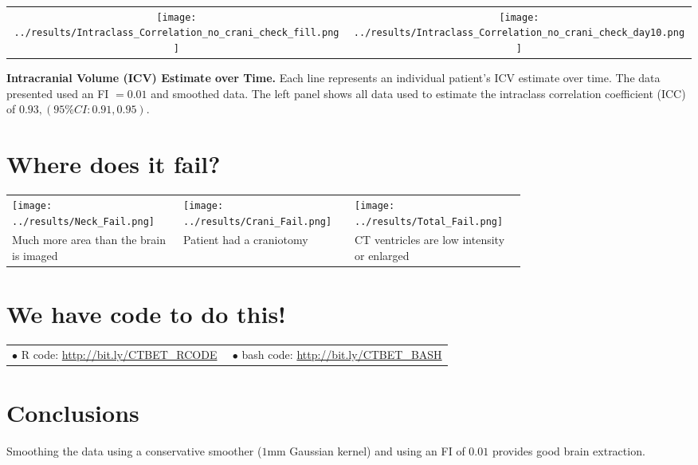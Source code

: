 \documentclass[final]{beamer}\usepackage[]{graphicx}\usepackage[]{color}
\begin{document}
\begin{frame}[fragile]
\begin{minipage}{0.39\linewidth}
\begin{tabular}{cc}
	\texttt{[image: ../results/Intraclass\_Correlation\_no\_crani\_check\_fill.png]} &
	\texttt{[image: ../results/Intraclass\_Correlation\_no\_crani\_check\_day10.png]} 
\end{tabular}

{\bf Intracranial Volume (ICV) Estimate over Time.}  Each line represents an individual patient's ICV estimate over time.  The data presented used an FI $= 0.01$ and smoothed data.   The left panel shows all data used to estimate the intraclass correlation coefficient (ICC) of $0.93, (95\% CI: 0.91, 0.95)$.  

%

\section{Where does it fail?}
\begin{center}
\begin{tabular}{>{\centering}m{0.25\linewidth}>{\centering}m{0.25\linewidth}>{\centering\arraybackslash}m{0.25\linewidth}}
\texttt{[image: ../results/Neck\_Fail.png]} &
\texttt{[image: ../results/Crani\_Fail.png]} & 
\texttt{[image: ../results/Total\_Fail.png]} \\
Much more area than the brain is imaged &
Patient had a craniotomy & 
CT ventricles are low intensity or enlarged 
\end{tabular}
\end{center}

\section{We have code to do this!}

\begin{tabular}{m{0.5\linewidth} m{0.5\linewidth} }
$\bullet$ R code: \url{http://bit.ly/CTBET_RCODE} & $\bullet$ bash code: \url{http://bit.ly/CTBET_BASH}
\end{tabular}


\section{Conclusions}
\vspace*{-0.5cm}
Smoothing the data using a conservative smoother ($1$mm Gaussian kernel) and using an FI of $0.01$ provides good brain extraction.





\end{minipage}
\end{frame}
\end{document}
